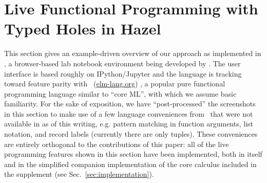 \newcommand{\examplesSec}{Live Functional Programming with Typed Holes in Hazel}
\section{\protect\examplesSec} %
\label{sec:examples}




\newcommand{\overviewExample}[2]{\paragraph{Example {#1}: {#2}}}

This section gives an example-driven overview of our  approach as implemented in  \Hazel, a browser-based lab notebook environment being developed by \citet{HazelnutSNAPL}. The \Hazel user interface is  based roughly on IPython/Jupyter \cite{PER-GRA:2007} and the \Hazel language is tracking toward feature parity with \Elm~(\url{elm-lang.org}) \cite{czaplicki2012elm,Elm}, a popular pure functional programming language similar to ``core ML'', with which we assume basic  familiarity.
For the sake of 
exposition, we have ``post-processed'' the screenshots in this section to make use of a few language conveniences from \Elm~that were not available in \Hazel as of this writing, e.g. pattern matching in function arguments, list  notation, and record labels (currently there are only tuples). These conveniences are entirely orthogonal to the contributions of this paper: all of the live programming features shown in this section have been implemented, both in \Hazel itself and in the simplified companion implementation of the core calculus included in the supplement (see Sec.~\ref{sec:implementation}).







